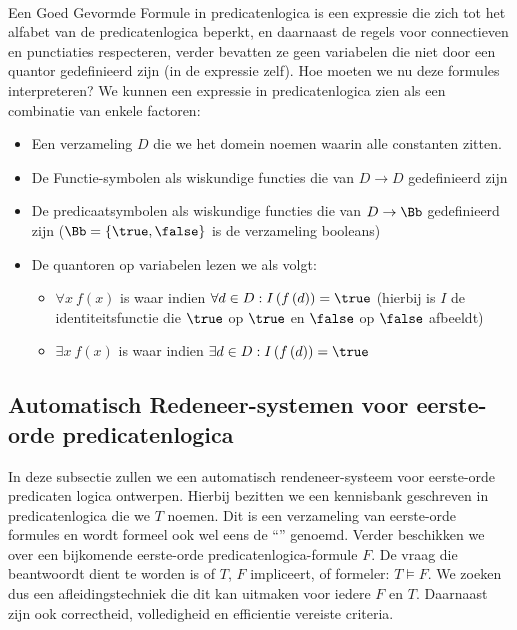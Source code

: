 \paragraph{}
Een Goed Gevormde Formule in predicatenlogica is een expressie die zich tot het alfabet van de predicatenlogica beperkt, en daarnaast de regels voor connectieven en punctiaties respecteren, verder bevatten ze geen variabelen die niet door een quantor gedefinieerd zijn (in de expressie zelf).
Hoe moeten we nu deze formules interpreteren? We kunnen een expressie in predicatenlogica zien als een combinatie van enkele factoren:
\begin{itemize}
 \item Een verzameling $D$ die we het domein noemen waarin alle constanten zitten.
 \item De Functie-symbolen als wiskundige functies die van $D\rightarrow D$ gedefinieerd zijn
 \item De predicaatsymbolen als wiskundige functies die van $D\rightarrow\Bb$ gedefinieerd zijn ($\Bb=\left\{\true,\false\right\}$ is de verzameling booleans)
 \item De quantoren op variabelen lezen we als volgt:
\begin{itemize}
 \item $\forall x\ f\left(x\right)$ is waar indien $\forall d\in D:I\left(f\left(d\right)\right)=\true$ (hierbij is $I$ de identiteitsfunctie die $\true$ op $\true$ en $\false$ op $\false$ afbeeldt)
 \item $\exists x\ f\left(x\right)$ is waar indien $\exists d\in D:I\left(f\left(d\right)\right)=\true$
\end{itemize}
\end{itemize}
\subsection{Automatisch Redeneer-systemen voor eerste-orde predicatenlogica}
In deze subsectie zullen we een automatisch rendeneer-systeem voor eerste-orde predicaten logica ontwerpen. Hierbij bezitten we een kennisbank geschreven in predicatenlogica die we $T$ noemen. Dit is een verzameling van eerste-orde formules en wordt formeel ook wel eens de ``'' genoemd. Verder beschikken we over een bijkomende eerste-orde predicatenlogica-formule $F$. De vraag die beantwoordt dient te worden is of $T$, $F$ impliceert, of formeler: $T\vDash F$. We zoeken dus een afleidingstechniek die dit kan uitmaken voor iedere $F$ en $T$. Daarnaast zijn ook correctheid, volledigheid en efficientie vereiste criteria.
